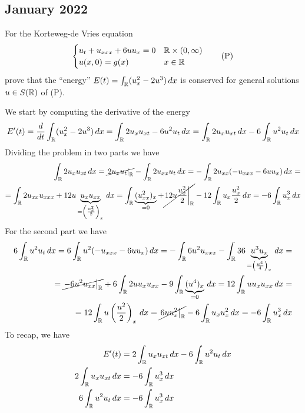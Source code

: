 \subsection{January 2022}
\begin{exercise}
    For the Korteweg-de Vries equation
    \[
        \begin{cases}
            u_t + u_{xxx} + 6 u u_x = 0 & \mathbb{R} \times (0, \infty) \\
            u(x, 0) = g(x)              & x \in \mathbb{R}
        \end{cases}
        \tag*{(P)}
    \]
    prove that the ``energy'' \(E(t) = \int_{\mathbb{R}} (u_x^2 - 2 u^3) \, dx\) is
    conserved for general solutions \(u \in S(\mathbb{R})\) of (P).
\end{exercise}
We start by computing the derivative of the energy
\[
    \begin{split}
        E'(t) = \frac{d}{dt} \int_{\mathbb{R}} (u_x^2 - 2 u^3) \, dx = \int_{\mathbb{R}} 2 u_x u_{xt} - 6 u^2 u_t \, dx = \int_{\mathbb{R}} 2 u_x u_{xt} \, dx - 6 \int_{\mathbb{R}} u^2 u_t \, dx
    \end{split}
\]
Dividing the problem in two parts we have
\[
    \begin{split}
        \int_{\mathbb{R}} 2 u_x u_{xt} \, dx = \cancel{\left.2 u_x u_t \right|_{\mathbb{R}}} - \int_{\mathbb{R}} 2u_{xx} u_t \, dx = - \int_{\mathbb{R}} 2u_{xx} ( - u_{xxx} - 6 u u_x) \, dx = \\
        = \int_{\mathbb{R}} 2u_{xx} u_{xxx} + 12 u \underbrace{u_x u_{xx}}_{=\left(\frac{u_x^2}{2}\right)_x} \, dx = \int_{\mathbb{R}} \underbrace{(u_{xx}^2)_x}_{=0} + \cancel{\left. 12 u \frac{u_x^2}{2} \right|_{\mathbb{R}}} - 12 \int_{\mathbb{R}} u_x \frac{u_x^2}{2} \, dx = - 6 \int_{\mathbb{R}} u_x^3 \, dx
    \end{split}
\]
For the second part we have
\[
    \begin{split}
        6 \int_{\mathbb{R}} u^2 u_t \, dx = 6 \int_{\mathbb{R}} u^2 (-u_{xxx} - 6 u u_x) \, dx = -\int_{\mathbb{R}} 6 u^2 u_{xxx} - \int_{\mathbb{R}} 36 \underbrace{u^3 u_x}_{=\left(\frac{u^4}{4}\right)_x} \, dx = \\
        = \cancel{\left. - 6 u^2 u_{xx} \right|_{\mathbb{R}}} + 6 \int_{\mathbb{R}} 2 u u_{x} u_{xx} - 9 \int_{\mathbb{R}} \underbrace{(u^4)_x}_{=0} \, dx = 12 \int_{\mathbb{R}} u u_x u_{xx} \, dx =                \\
        =12 \int_{\mathbb{R}} u\left(\frac{u^2}{2}\right)_x \, dx = \cancel{\left. 6 u u_x^2 \right|_{\mathbb{R}}} - 6 \int_{\mathbb{R}} u_x u^2_x \, dx = - 6 \int_{\mathbb{R}} u_x^3 \, dx
    \end{split}
\]
To recap, we have
\begin{align*}
    E'(t)                         & = 2\int_{\mathbb{R}} u_x u_{xt} \, dx - 6 \int_{\mathbb{R}} u^2 u_t \, dx \\
    2\int_{\mathbb{R}}  u_x u_{xt} \, dx & = - 6 \int_{\mathbb{R}} u_x^3 \, dx                                \\
    6\int_{\mathbb{R}}  u^2 u_t \, dx    & = - 6 \int_{\mathbb{R}} u_x^3 \, dx
\end{align*}
